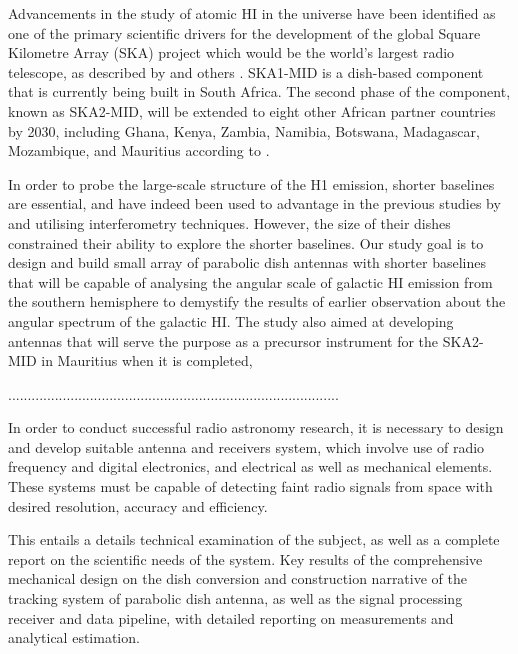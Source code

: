 {Advancements in the study of atomic HI in the universe have been identified as one of the primary scientific drivers for the development of the global Square Kilometre Array (SKA) project \cite{taylor2012square, schilizzi2011project} which would be the world's largest radio telescope, as described by \cite{taylor2012square} and others  \cite{wang2020ska}. SKA1-MID is a dish-based component that is currently being built in South Africa. The second phase of the component, known as SKA2-MID, will be extended to eight other African partner countries by 2030, including Ghana, Kenya, Zambia, Namibia, Botswana, Madagascar, Mozambique, and Mauritius according to \cite{hoare2018uk}.

In order to probe the large-scale structure of the H1 emission, shorter baselines are essential, and have indeed been  used to advantage in the previous studies by \cite{green1993power} and \cite{dickey2001southern} utilising interferometry techniques. However, the size of their dishes constrained their ability to explore the shorter baselines.
Our study goal is to design and build small array of parabolic dish antennas with shorter baselines that will be capable of analysing the angular scale of galactic HI emission from the southern hemisphere to demystify the results of earlier observation about the angular spectrum of the galactic HI. The study also aimed at developing antennas that will serve the purpose as a precursor instrument for the SKA2-MID in Mauritius when it is completed,  







.....................................................................................

In order to conduct successful radio astronomy research, it is necessary to design and develop suitable antenna and receivers system, which involve use of radio frequency and digital electronics, and electrical as well as mechanical elements.
These systems must be capable of detecting faint radio signals from space with desired resolution, accuracy and efficiency.

This entails a details technical examination of the subject, as well as a complete report on the scientific needs of the system. Key results of the comprehensive mechanical design on the dish conversion and construction narrative of the tracking system of parabolic dish antenna, as well as the signal processing receiver and data pipeline, with detailed reporting on measurements and analytical estimation.

}
